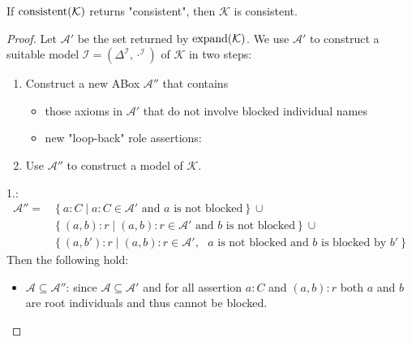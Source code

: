 \begin{lemma}[Soundness]
	If $\operatorname{\text{consistent}}(\mathcal{K})$ returns "consistent", then $\mathcal{K}$ is consistent.
\end{lemma}
\begin{proof}
	Let $\mathcal{A}'$ be the set returned by $\operatorname{\text{expand}}(\mathcal{K})$.
	We use $\mathcal{A}'$ to construct a suitable model $\mathcal{I} = (\Delta^\mathcal{I}, \cdot^\mathcal{I})$
	of $\mathcal{K}$ in two steps:
	\begin{enumerate}
		\item Construct a new ABox $\mathcal{A}''$ that contains
			\begin{itemize}
				\item those axioms in $\mathcal{A}'$ that do not involve blocked individual names
				\item new "loop-back" role assertions:
					\begin{figure}[H]
						\centering
					\end{figure}
			\end{itemize}
		\item Use $\mathcal{A}''$ to construct a model of $\mathcal{K}$.
	\end{enumerate}
	1.:
	\begin{align*}
		\mathcal{A}'' = &\left\{ a:C \mid a:C \in \mathcal{A}' \text{ and $a$ is not blocked} \right\} \cup \\
						&\left\{ (a,b):r \mid (a,b):r \in \mathcal{A}' \text{ and $b$ is not blocked} \right\} \cup \\
						&\left\{ (a,b'):r \mid (a,b):r \in \mathcal{A}', \text{ $a$ is not blocked and $b$ is blocked by  $b'$} \right\}
	\end{align*}
	Then the following hold:
	\begin{itemize}
		\item 
			\begin{subproof}
				$\mathcal{A} \subseteq \mathcal{A}''$: since $\mathcal{A} \subseteq \mathcal{A}'$ and for all assertion
				$a:C$ and  $(a,b):r$ both $a$ and $b$ are root individuals
				and thus cannot be blocked.
			\end{subproof}
	\end{itemize}
\end{proof}
